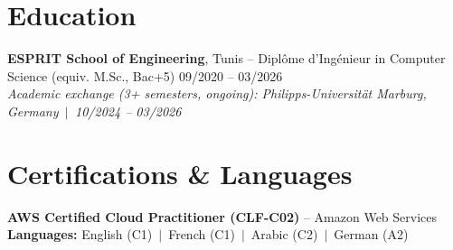 \documentclass[a4paper,10pt]{article}
\begin{document}
\section*{Education}
\textbf{ESPRIT School of Engineering}, Tunis -- Dipl\^ome d'Ing\'enieur in Computer Science (equiv. M.Sc., Bac+5) \hfill 09/2020 -- 03/2026\\
\textit{\small Academic exchange (3+ semesters, ongoing): Philipps-Universit\"at Marburg, Germany \,$|$\, 10/2024 -- 03/2026}

\section*{Certifications \& Languages}
\textbf{AWS Certified Cloud Practitioner (CLF-C02)} -- Amazon Web Services\\
\textbf{Languages:} English (C1) \,$|$\, French (C1) \,$|$\, Arabic (C2) \,$|$\, German (A2)
\end{document}
